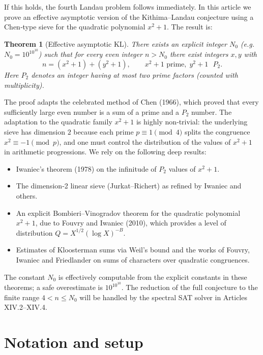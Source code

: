 \documentclass[11pt,a4paper]{article}
\newtheorem{theorem}{Theorem}[section]
\begin{document}
If this holds, the fourth Landau problem follows immediately. In this article we prove an effective asymptotic version of the Kithima–Landau conjecture using a Chen‑type sieve for the quadratic polynomial \(x^{2}+1\). The result is:

\begin{theorem}[Effective asymptotic KL]
\label{thm:main}
There exists an explicit integer \(N_{0}\) (e.g. \(N_{0}=10^{10^{10}}\)) such that for every even integer \(n>N_{0}\) there exist integers \(x,y\) with
\[
n=(x^{2}+1)+(y^{2}+1),\qquad x^{2}+1\text{ prime},\; y^{2}+1\text{ }P_{2}.
\]
Here \(P_{2}\) denotes an integer having at most two prime factors (counted with multiplicity).
\end{theorem}

The proof adapts the celebrated method of Chen (1966), which proved that every sufficiently large even number is a sum of a prime and a \(P_{2}\) number. The adaptation to the quadratic family \(x^{2}+1\) is highly non‑trivial: the underlying sieve has dimension \(2\) because each prime \(p\equiv 1\pmod 4\) splits the congruence \(x^{2}\equiv -1\pmod p\), and one must control the distribution of the values of \(x^{2}+1\) in arithmetic progressions. We rely on the following deep results:

\begin{itemize}
\item Iwaniec's theorem (1978) on the infinitude of \(P_{2}\) values of \(x^{2}+1\).
\item The dimension‑2 linear sieve (Jurkat–Richert) as refined by Iwaniec and others.
\item An explicit Bombieri–Vinogradov theorem for the quadratic polynomial \(x^{2}+1\), due to Fouvry and Iwaniec (2010), which provides a level of distribution \(Q = X^{1/2}(\log X)^{-B}\).
\item Estimates of Kloosterman sums via Weil's bound and the works of Fouvry, Iwaniec and Friedlander on sums of characters over quadratic congruences.
\end{itemize}

The constant \(N_{0}\) is effectively computable from the explicit constants in these theorems; a safe overestimate is \(10^{10^{10}}\). The reduction of the full conjecture to the finite range \(4<n\le N_{0}\) will be handled by the spectral SAT solver in Articles XIV.2–XIV.4.

\section{Notation and setup}
\end{document}
